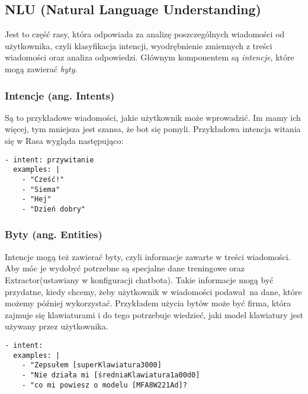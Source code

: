 \documentclass{article}
\begin{document}
\subsection{NLU (Natural Language Understanding)}
Jest to część rasy, która odpowiada za analizę poszczególnych wiadomości od 
użytkownika, czyli klasyfikacja intencji, wyodrębnienie zmiennych z treści
wiadomości oraz analiza odpowiedzi. Głównym komponentem są \emph{intencje},
które mogą zawierać \emph{byty}.

\subsubsection{Intencje (ang. Intents)}
Są to przykładowe wiadomości, jakie użytkownik może wprowadzić. Im mamy ich
więcej, tym mniejsza jest szansa, że bot się pomyli. Przykładowa intencja
witania się w Rasa wygląda następująco:

\begin{lstlisting}[caption=Przykładowa intencja]
- intent: przywitanie
  examples: |
    - "Cześć!"
    - "Siema"
    - "Hej"
    - "Dzień dobry"
\end{lstlisting}

\subsubsection{Byty (ang. Entities)}
Intencje mogą też zawierać byty, czyli informacje zawarte w treści wiadomości.
Aby móc je wydobyć potrzebne są specjalne dane treningowe oraz
Extractor(ustawiany w konfiguracji chatbota). Takie informacje mogą być
przydatne, kiedy chcemy, żeby użytkownik w wiadomości podawał na dane, które
możemy później wykorzystać. Przykładem użycia bytów może być firma, która
zajmuje się klawiaturami i do tego potrzebuje wiedzieć, jaki model klawiatury
jest używany przez użytkownika.

\begin{lstlisting}[caption=Przykładowa intencja z użyciem bytów]
- intent: 
  examples: |
    - "Zepsułem [superKlawiatura3000]
    - "Nie działa mi [średniaKlawiatura1a00d0]
    - "co mi powiesz o modelu [MFA8W221Ad]?
\end{lstlisting}
\end{document}
